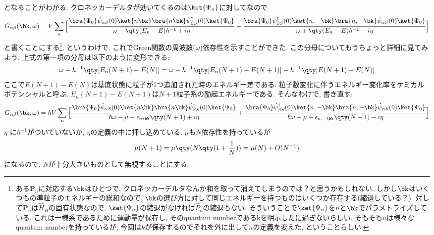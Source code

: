 \documentclass[10.5pt,a4paper]{jreport}
\begin{document}
となることがわかる. クロネッカーデルタが効いてくるのは$\ket{\Psi_n}$に対してなので
\begin{eqnarray}
  G_{\alpha\beta}(\bk, \omega) = V\sum_n\Big[\frac{\bra{\Psi_0}\hat{\psi}_{\alpha S}(0)\ket{n\bk}\bra{n\bk}\hat{\psi}^\dagger_{\beta S}(0)\ket{\Psi_0}}{\omega - \qty(E_n - E)\hbar^{-1} + i\eta}+ \frac{\bra{\Psi_0}\hat{\psi}^\dagger_{\beta S}(0)\ket{n, -\bk}\bra{n, -\bk}\hat{\psi}_{\alpha S}(0)\ket{\Psi_0}}{\omega + \qty(E_n - E)\hbar^{-1} - i\eta}\Big]
\end{eqnarray}
と書くことにする\footnote{ある$\bm{P}_n$に対応する$\bk$はひとつで, クロネッカーデルタなんか和を取って消えてしまうのでは？と思うかもしれない. しかし$\bk$はいくつもの準粒子のエネルギーの総和なので, $\bk$の選び方に対して同じエネルギーを持つものはいくつか存在する(縮退している？). 対して$\bm{P}_n$は$\hat{H}_H$の固有状態なので, $\ket{\Psi_n}$の縮退がなければ$\hat{P}_n$の縮退もない. そういうことで$\ket{\Psi_n}$を$n$と$\bk$でパラメトライズしている. これは一様系であるために運動量が保存し, そのquantum numberであるkを明示したに過ぎないらしい. そもそも$n$は様々なquantum numberを持っているが, 今回は$k$が保存するのでそれを外に出して$n$の定義を変えた, ということらしい. }. というわけで, これでGreen関数の周波数($\omega$)依存性を示すことができた. この分母についてもうちょっと詳細に見てみよう. 上式の第一項の分母は以下のように変形できる:
\begin{eqnarray}
  \omega - \hbar^{-1}\qty[E_n(N+1) - E(N)] = \omega - \hbar^{-1}\qty[E_n(N+1) - E(N+1)] -\hbar^{-1}\qty[E(N+1) - E(N)]
\end{eqnarray}
ここで$E(N+1) - E(N)$は基底状態に粒子が1つ追加された時のエネルギー差である. 粒子数変化に伴うエネルギー変化率をケミカルポテンシャルと呼ぶ. $E_n(N+1) - E(N+1)$は$N+1$粒子系の励起エネルギーである. そんなわけで, 書き直す:
\begin{eqnarray}
  G_{\alpha\beta}(\bk, \omega) = \hbar V\sum_n\Big[\frac{\bra{\Psi_0}\hat{\psi}_{\alpha S}(0)\ket{n\bk}\bra{n\bk}\hat{\psi}^\dagger_{\beta S}(0)\ket{\Psi_0}}{\hbar\omega -\mu - \epsilon_{n\bk}\qty(N+1) + i\eta}+ \frac{\bra{\Psi_0}\hat{\psi}^\dagger_{\beta S}(0)\ket{n, -\bk}\bra{n, -\bk}\hat{\psi}_{\alpha S}(0)\ket{\Psi_0}}{\hbar\omega -\mu + \epsilon_{n,-\bk}\qty(N-1) - i\eta}\Big]\label{green-rehmann}
\end{eqnarray}
$\eta$ に$\hbar^{-1}$がついていないが, $\eta$の定義の中に押し込めている. $\mu$も$N$依存性を持っているが
\begin{eqnarray}
  \mu(N+1) = \mu\qty(N\qty(1+\frac{1}{N})) = \mu(N) + O(N^{-1})
\end{eqnarray}
になるので, $N$が十分大きいものとして無視することにする.
\end{document}
